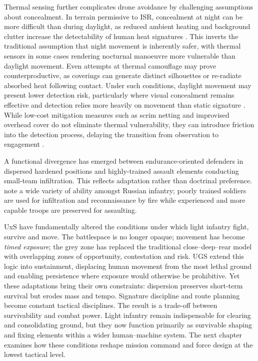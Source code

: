 {Thermal sensing further complicates drone avoidance by challenging assumptions about concealment. In terrain permissive to ISR, concealment at night can be more difficult than during daylight, as reduced ambient heating and background clutter increase the detectability of human heat signatures \parencite[2:15--3:00]{civdiv_11}. This inverts the traditional assumption that night movement is inherently safer, with thermal sensors in some cases rendering nocturnal manoeuvre more vulnerable than daylight movement. Even attempts at thermal camouflage may prove counterproductive, as coverings can generate distinct silhouettes or re-radiate absorbed heat following contact. Under such conditions, daylight movement may present lower detection risk, particularly where visual concealment remains effective and detection relies more heavily on movement than static signature \parencite[8:14--8:20]{civdiv_6}. While low-cost mitigation measures such as scrim netting and improvised overhead cover do not eliminate thermal vulnerability, they can introduce friction into the detection process, delaying the transition from observation to engagement \parencite[0:16--50]{civdiv_11}.




A functional divergence has emerged between endurance-oriented defenders in dispersed hardened positions and highly-trained assault elements conducting small-team infiltration. This reflects adaptation rather than doctrinal preference. \textcite[8]{WATLING_2023A} note a wide variety of ability amongst Russian infantry; poorly trained soldiers are used for infiltration and reconnaissance by fire while experienced and more capable troops are preserved for assaulting.


UxS have fundamentally altered the conditions under which light infantry fight, survive and move. The battlespace is no longer opaque; movement has become \textit{timed exposure}; the grey zone has replaced the traditional close--deep--rear model with overlapping zones of opportunity, contestation and risk. UGS extend this logic into sustainment, displacing human movement from the most lethal ground and enabling persistence where exposure would otherwise be prohibitive. Yet these adaptations bring their own constraints: dispersion preserves short-term survival but erodes mass and tempo. Signature discipline and route planning become constant tactical disciplines. The result is a trade-off between survivability and combat power. Light infantry remain indispensable for clearing and consolidating ground, but they now function primarily as survivable shaping and fixing elements within a wider human--machine system. The next chapter examines how these conditions reshape mission command and force design at the lowest tactical level.



}
